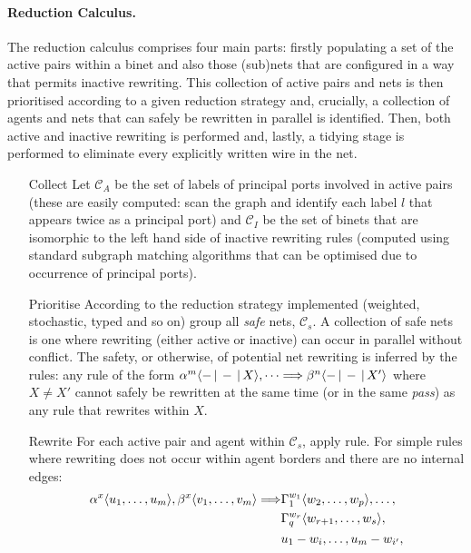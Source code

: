 \documentclass[copyright,creativecommons]{eptcs}
\begin{document}
\paragraph{Reduction Calculus.}
The reduction calculus comprises four main parts: firstly populating
a set of the active pairs within a binet and also those (sub)nets that
are configured in a way that permits inactive rewriting.
This collection of active pairs and nets is then prioritised according
to a given reduction strategy and, crucially, a collection of agents and nets that can safely be
rewritten in parallel is identified.  Then, both active and
inactive rewriting is performed and, lastly, a tidying stage is
performed to eliminate every explicitly written wire in the net.


\begin{itemize}
\item[Collect] Let $\mathcal{C}_A$ be the set of labels of principal
  ports involved in active pairs (these are easily computed: scan the
  graph and identify each label $l$ that appears twice as a principal
  port) and $\mathcal{C}_I$ be the set of binets that are isomorphic
  to the left hand side of inactive rewriting rules (computed using
  standard subgraph matching algorithms that can be optimised due
  to occurrence of principal ports).
\item[Prioritise] According to the reduction strategy implemented
  (weighted, stochastic, typed and so on) group all \emph{safe} nets,
  $\mathcal{C}_s$.  A collection of safe nets is one where rewriting
  (either active or inactive) can occur in parallel without conflict.
  The safety, or otherwise, of potential net rewriting is inferred by
  the rules: any rule of the form $\alpha^{m} \langle - \,|\, - \,|\, X \rangle,\dots
  \Longrightarrow \beta^{n} \langle - \,|\, - \,|\, X' \rangle$ where $X \neq X'$ cannot
  safely be rewritten at the same time (or in the same \emph{pass}) as
  any rule that rewrites within $X$.
\item[Rewrite] For each active pair and agent within $\mathcal{C}_s$,
  apply rule.  For simple rules where rewriting does not occur within
  agent borders and there are no internal edges:
\begin{equation*}
\begin{split}
\bnetm{\alpha}{x}{u_1,\dots,u_m}, \bnetm{\beta}{x}{v_1,\dots,v_m} \Longrightarrow & \bnetm{\Gamma_1}{w_1}{w_2,\dots,w_p},\dots,\\
& \bnetm{\Gamma_q}{w_r}{w_{r+1},\dots,w_s},\\
& u_1-w_i,\dots,u_m-w_{i'},\\

\end{split}
\end{equation*}
\end{itemize}
\end{document}
